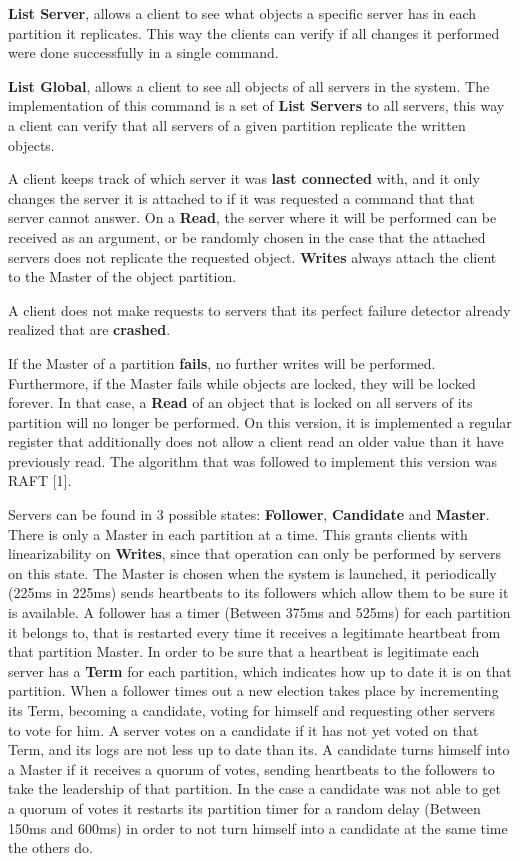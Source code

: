 \documentclass[times, 10pt,twocolumn]{article}
\begin{document}
\textbf{List Server}, allows a client to see what objects a specific server has in each partition it replicates. This way the clients can verify if all changes it performed were done successfully in a single command.

\textbf{List Global}, allows a client to see all objects of all servers in the system. The implementation of this command is a set of \textbf{List Servers} to all servers, this way a client can verify that all servers of a given partition replicate the written objects.

A client keeps track of which server it was \textbf{last connected} with, and it only changes the server it is attached to if it was requested a command that that server cannot answer. On a \textbf{Read}, the server where it will be performed can be received as an argument, or be randomly chosen in the case that the attached servers does not replicate the requested object. \textbf{Writes} always attach the client to the Master of the object partition.

A client does not make requests to servers that its perfect failure detector already realized that are \textbf{crashed}.

If the Master of a partition \textbf{fails}, no further writes will be performed. Furthermore, if the Master fails while objects are locked, they will be locked forever. In that case, a \textbf{Read} of an object that is locked on all servers of its partition will no longer be performed.
On this version, it is implemented a regular register that additionally does not allow a client read an older value than it have previously read. The algorithm that was followed to implement this version was RAFT [1].

Servers can be found in 3 possible states: \textbf{Follower}, \textbf{Candidate} and \textbf{Master}. There is only a Master in each partition at a time. This grants clients with linearizability on \textbf{Writes}, since that operation can only be performed by servers on this state. The Master is chosen when the system is launched, it periodically (225ms in 225ms) sends heartbeats to its followers which allow them to be sure it is available. A follower has a timer (Between 375ms and 525ms) for each partition it belongs to, that is restarted every time it receives a legitimate heartbeat from that partition Master. In order to be sure that a heartbeat is legitimate each server has a \textbf{Term} for each partition, which indicates how up to date it is on that partition. When a follower times out a new election takes place by incrementing its Term, becoming a candidate, voting for himself and requesting other servers to vote for him. A server votes on a candidate if it has not yet voted on that Term, and its logs are not less up to date than its. A candidate turns himself into a Master if it receives a quorum of votes, sending heartbeats to the followers to take the leadership of that partition. In the case a candidate was not able to get a quorum of votes it restarts its partition timer for a random delay (Between 150ms and 600ms) in order to not turn himself into a candidate at the same time the others do. 
\end{document}
